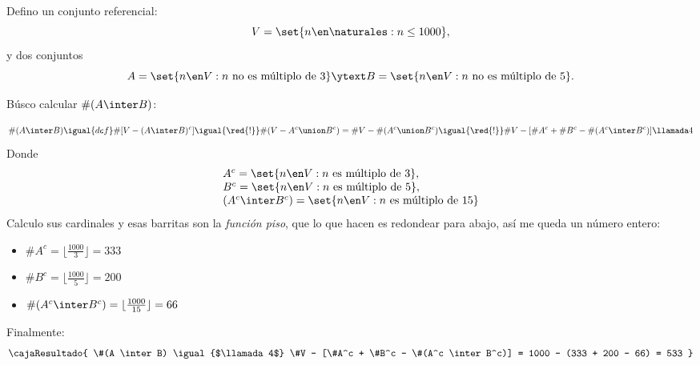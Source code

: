 \bigskip

Defino un conjunto referencial:
$$
  V = \set{n \en \naturales : n \leq 1000},$$
y dos conjuntos
$$
  A = \set{n \en V : n \text{ no es múltiplo de } 3}
  \ytext
  B = \set{n \en V : n \text{ no es múltiplo de } 5}.
$$

Búsco calcular $\#(A \inter B)$:

$$
  \#(A \inter B)
  \igual{def}
  \#[V - (A \inter B)^c]
  \igual{\red{!}}
  \#(V - A^c \union B^c) = \#V - \#(A^c \union B^c)
  \igual{\red{!}}
  \#V - [\#A^c + \#B^c - \#(A^c \inter B^c)]\llamada4
$$
Donde
$$
  \begin{array}{l}
    A^c = \set{n \en V : n \text{ es múltiplo de } 3}, \\
    B^c = \set{n \en V : n \text{ es múltiplo de } 5}, \\
    (A^c \inter B^c) = \set{n \en V : n \text{ es múltiplo de } 15}
  \end{array}
$$
Calculo sus cardinales y esas barritas son la \textit{función piso}, que lo que hacen es redondear para abajo, así me queda un número entero:
\begin{multicols}{3}
  \begin{itemize}
    \item $\#A^c = \lfloor \frac{1000}{3} \rfloor = 333$
    \item $\#B^c = \lfloor \frac{1000}{5} \rfloor = 200$
    \item $\#(A^c \inter B^c) = \lfloor \frac{1000}{15} \rfloor = 66$
  \end{itemize}
\end{multicols}

Finalmente:
$$
  \cajaResultado{
  \#(A \inter B)
  \igual{$\llamada4$}
  \#V - [\#A^c + \#B^c - \#(A^c \inter B^c)]
  =
  1000 - (333 + 200 - 66) = 533
  }
$$

\begin{aportes}
  \item {}
\end{aportes}
